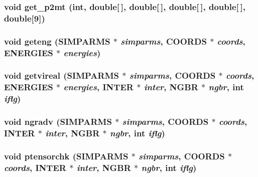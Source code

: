 \subsubsection{\setlength{\rightskip}{0pt plus 5cm}void get\_\-p2mt (int, double[$\,$], double[$\,$], double[$\,$], double[$\,$], double[9])}\label{md__fcntr_8c_7f53df90f37b6a5aaedee6e1c55a054d}


\subsubsection{\setlength{\rightskip}{0pt plus 5cm}void geteng ({\bf SIMPARMS} $\ast$ {\em simparms}, {\bf COORDS} $\ast$ {\em coords}, {\bf ENERGIES} $\ast$ {\em energies})}\label{md__fcntr_8c_a8bd253f2ff17437723ee5fa350dfc29}


\subsubsection{\setlength{\rightskip}{0pt plus 5cm}void getvireal ({\bf SIMPARMS} $\ast$ {\em simparms}, {\bf COORDS} $\ast$ {\em coords}, {\bf ENERGIES} $\ast$ {\em energies}, {\bf INTER} $\ast$ {\em inter}, {\bf NGBR} $\ast$ {\em ngbr}, int {\em iflg})}\label{md__fcntr_8c_ed11c84ded4213d40912843a0a98296d}


\subsubsection{\setlength{\rightskip}{0pt plus 5cm}void ngradv ({\bf SIMPARMS} $\ast$ {\em simparms}, {\bf COORDS} $\ast$ {\em coords}, {\bf INTER} $\ast$ {\em inter}, {\bf NGBR} $\ast$ {\em ngbr}, int {\em iflg})}\label{md__fcntr_8c_42d991234ac5d82d01f595fa4ee9000b}


\subsubsection{\setlength{\rightskip}{0pt plus 5cm}void ptensorchk ({\bf SIMPARMS} $\ast$ {\em simparms}, {\bf COORDS} $\ast$ {\em coords}, {\bf INTER} $\ast$ {\em inter}, {\bf NGBR} $\ast$ {\em ngbr}, int {\em iflg})}\label{md__fcntr_8c_f188549614d77490e3b051490ec1fc8e}


